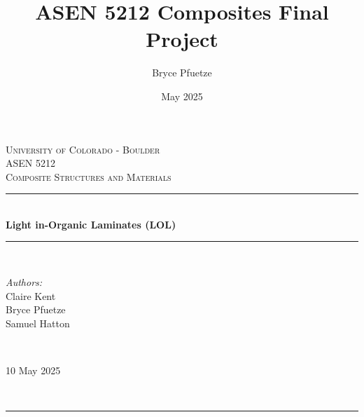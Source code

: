 \documentclass[12pt]{article}
\title{ASEN 5212 Composites Final Project}
\author{Bryce Pfuetze}
\date{May 2025}
\newcommand{\HRule}{\rule{\linewidth}{0.5mm}}
\begin{document}
\begin{titlepage}

\center
 
\textsc{\Large University of Colorado - Boulder}\\[.75cm] 
\vspace{-1em}
\textsc{\large ASEN 5212\\Composite Structures and Materials}\\[0.25cm]

\HRule \\[0.2cm]
{ \huge \bfseries Light in-Organic Laminates (LOL)  \\[0.25cm]}
\HRule \\[.5cm]

\begin{minipage}{0.70\textwidth}
\begin{flushleft} \large
\renewcommand{\thempfootnote}{\fnsymbol{mpfootnote}}
\emph{Authors:}\\  Claire Kent \\ Bryce Pfuetze \\ Samuel Hatton
\end{flushleft}
\end{minipage}
~
\begin{minipage}{0.25\textwidth}
\begin{flushright} \large
{\large 10 May 2025}\\[1.5em]
\end{flushright}
\end{minipage}\\[1em]



\HRule \\[4em]


\end{titlepage}
\end{document}
